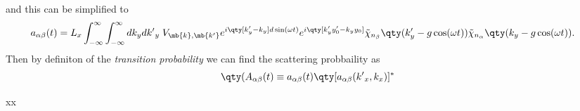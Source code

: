 and this can be simplified to
\begin{equation} \label{0.5}
  \begin{aligned}
    a_{\alpha\beta}(t) =
    L_x
    \int_{-\infty}^{\infty} \int_{-\infty}^{\infty} dk_y d{k'}_y \;
    V_{\mb{k}, \mb{k'}} &
    e^{
      i\qty[k'_y - k_y]d\sin(\omega t)
    }
    e^{
      i\qty[k'_y y'_0 - k_y y_0]
    }
    \tilde{\chi}_{n_{\beta}}\qty(k'_y -g\cos(\omega t))
    \tilde{\chi}_{n_{\alpha}}\qty(k_y -g\cos(\omega t)).
  \end{aligned}
\end{equation}
Then by definiton of the \textit{transition probability} we can find the scattering probbaility as
\begin{equation} \label{0.6}
    \qty(A_{\alpha\beta}(t) \equiv
    a_{\alpha\beta}(t)\qty[a_{\alpha\beta}({k'}_x,k_x)]^{*}
\end{equation}















xx

